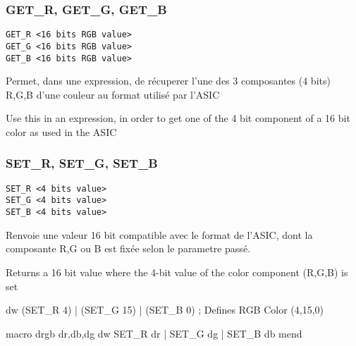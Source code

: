 \subsubsection{GET\_R, GET\_G, GET\_B}

\begin{verbatim}
GET_R <16 bits RGB value>
GET_G <16 bits RGB value>
GET_B <16 bits RGB value>
\end{verbatim}

\begin{xfr}
Permet, dans une expression, de récuperer l'une des 3 composantes (4 bits) R,G,B d'une couleur au format utilisé par l'ASIC
\end{xfr}

\begin{xen}
Use this in an expression, in order to get one of the 4 bit component of a 16 bit color as used in the ASIC
\end{xen}

\subsubsection{SET\_R, SET\_G, SET\_B}
\begin{verbatim}
SET_R <4 bits value>
SET_G <4 bits value>
SET_B <4 bits value>
\end{verbatim}

\begin{xfr}
Renvoie une valeur 16 bit compatible avec le format de l'ASIC, dont la composante R,G ou B est fixée selon le parametre passé.
\end{xfr}

\begin{xen}
Returns a 16 bit value where the 4-bit value of the color component (R,G,B) is set 
\end{xen}

\begin{code}
  dw (SET\_R 4) | (SET\_G 15) | (SET\_B 0) ; Defines RGB Color  (4,15,0)
\end{code}
\begin{code}
  macro drgb dr,db,dg
  dw SET\_R {dr} | SET\_G {dg} | SET\_B {db}
  mend
\end{code}


\subsection{}

